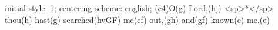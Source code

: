 initial-style: 1;
centering-scheme: english;
(c4)O(g) Lord,(hj) <sp>*</sp> thou(h) hast(g) searched(hvGF) me(ef) out,(gh) and(gf) known(e) me.(e)
